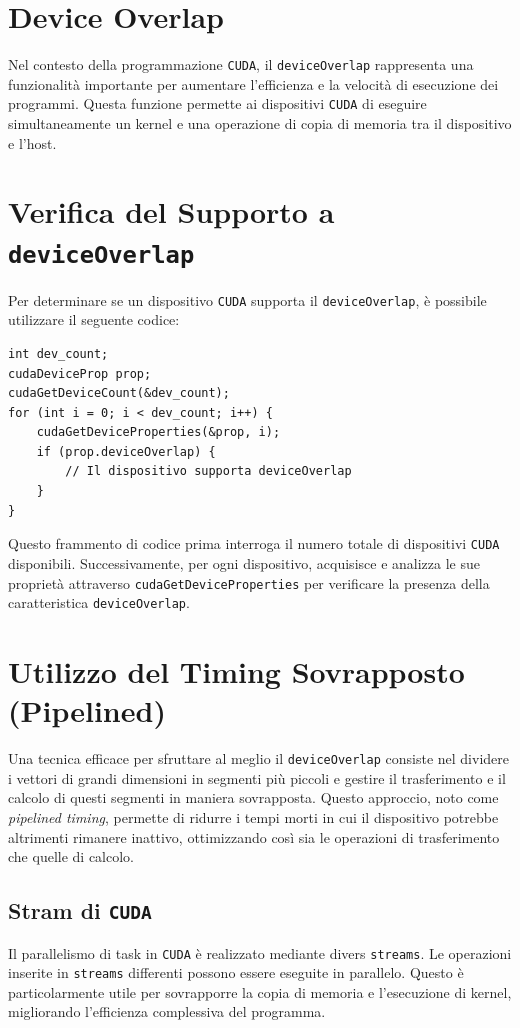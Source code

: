 \section{Device Overlap}

Nel contesto della programmazione \texttt{CUDA}, il \texttt{deviceOverlap}
rappresenta una funzionalità importante per aumentare l'efficienza e
la velocità di esecuzione dei programmi. Questa funzione permette ai
dispositivi \texttt{CUDA} di eseguire simultaneamente un kernel
e una operazione di copia di memoria tra il dispositivo e l'host.

\section*{Verifica del Supporto a \texttt{deviceOverlap}}
Per determinare se un dispositivo \texttt{CUDA} supporta il
\texttt{deviceOverlap},
è possibile utilizzare il seguente codice:

\begin{lstlisting}
int dev_count; 
cudaDeviceProp prop;
cudaGetDeviceCount(&dev_count);
for (int i = 0; i < dev_count; i++) {
    cudaGetDeviceProperties(&prop, i);
    if (prop.deviceOverlap) {
        // Il dispositivo supporta deviceOverlap
    }
}
\end{lstlisting}

Questo frammento di codice prima interroga il numero totale di dispositivi
\texttt{CUDA} disponibili. Successivamente, per ogni dispositivo, acquisisce
e analizza le sue proprietà attraverso \texttt{cudaGetDeviceProperties} per
verificare la presenza della caratteristica \texttt{deviceOverlap}.

\section*{Utilizzo del Timing Sovrapposto (Pipelined)}
Una tecnica efficace per sfruttare al meglio il \texttt{deviceOverlap}
consiste nel dividere i vettori di grandi dimensioni in segmenti più piccoli
e gestire il trasferimento e il calcolo di questi segmenti in maniera
sovrapposta. Questo approccio, noto come \textit{pipelined timing},
permette di ridurre i tempi morti in cui il dispositivo potrebbe altrimenti
rimanere inattivo, ottimizzando così sia le operazioni di trasferimento che
quelle di calcolo.

\subsection{Stram di \texttt{CUDA}}
Il parallelismo di task in \texttt{CUDA} è realizzato mediante divers
 \texttt{streams}. Le operazioni inserite in \texttt{streams} differenti
 possono essere eseguite in parallelo. Questo è particolarmente utile per
 sovrapporre la copia di memoria e l'esecuzione di kernel, migliorando
 l'efficienza complessiva del programma.

